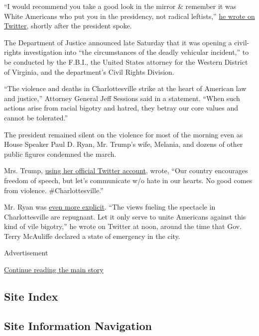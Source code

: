 ``I would recommend you take a good look in the mirror \& remember it
was White Americans who put you in the presidency, not radical
leftists,''
\href{https://twitter.com/DrDavidDuke/status/896431991821926401}{he
wrote on Twitter}, shortly after the president spoke.

The Department of Justice announced late Saturday that it was opening a
civil-rights investigation into ``the circumstances of the deadly
vehicular incident,'' to be conducted by the F.B.I., the United States
attorney for the Western District of Virginia, and the department's
Civil Rights Division.

``The violence and deaths in Charlottesville strike at the heart of
American law and justice,'' Attorney General Jeff Sessions said in a
statement. ``When such actions arise from racial bigotry and hatred,
they betray our core values and cannot be tolerated.''

The president remained silent on the violence for most of the morning
even as House Speaker Paul D. Ryan, Mr. Trump's wife, Melania, and
dozens of other public figures condemned the march.

Mrs. Trump,
\href{https://twitter.com/FLOTUS/status/896409989568507906}{using her
official Twitter account}, wrote, ``Our country encourages freedom of
speech, but let's communicate w/o hate in our hearts. No good comes from
violence. \#Charlottesville.''

Mr. Ryan was
\href{https://twitter.com/SpeakerRyan/status/896400866361704449}{even
more explicit}. ``The views fueling the spectacle in Charlottesville are
repugnant. Let it only serve to unite Americans against this kind of
vile bigotry,'' he wrote on Twitter at noon, around the time that Gov.
Terry McAuliffe declared a state of emergency in the city.

Advertisement

\protect\hyperlink{after-bottom}{Continue reading the main story}

\hypertarget{site-index}{%
\subsection{Site Index}\label{site-index}}

\hypertarget{site-information-navigation}{%
\subsection{Site Information
Navigation}\label{site-information-navigation}}


